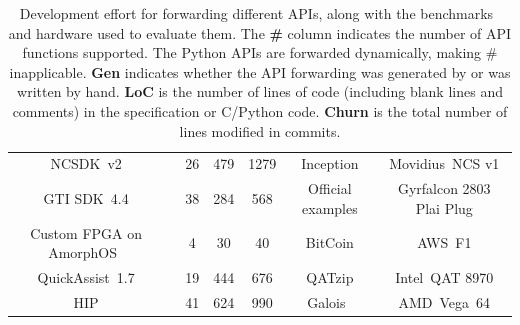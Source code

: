 \begin{table}
\begin{tabular}{ccccccc}
	NCSDK~v2                    & \checkmark       & 26                   & 479                    & 1279                    & Inception                & Movidius~NCS v1                         \\
	GTI SDK~4.4                 & \checkmark       & 38                   & 284                    & 568                     & Official examples    & Gyrfalcon 2803 Plai Plug                         \\
	Custom FPGA on AmorphOS~\cite{amorphos}     & \checkmark       & 4                    & 30                     & 40                      & BitCoin  & AWS~F1                                        \\
	QuickAssist~1.7             & \checkmark       & 19                   & 444                    & 676                     & QATzip                   & Intel~QAT 8970                      \\
	HIP                         & \checkmark       & 41                   & 624                    & 990                     & Galois~\cite{tao}        & AMD~Vega~64                                   \\
	\bottomrule
	\end{tabular}
	\caption{Development effort for forwarding different APIs, along with the benchmarks~\cite{inceptionv3,vggnet,rodinia} and hardware used to evaluate them.
      The \textbf{\#} column indicates the number of API functions supported.
      The Python APIs are forwarded dynamically, making \# inapplicable.
      \textbf{Gen} indicates whether the API forwarding was generated by \Compiler or was written by hand.
      \textbf{LoC} is the number of lines of code (including blank lines and comments) in the \compiler specification or C/Python code.
      \textbf{Churn} is the total number of lines modified in commits.
    }
	\label{tab:apis-and-accelerators}
	\vspace*{-.2em}
\end{table}

